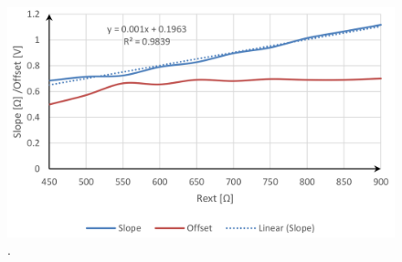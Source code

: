 \begin{figure}
\centering
\includegraphics[width=\textwidth]{Immagini/R3Karagounis}
\caption{ .}%
\label{R3Karagounis}
\end{figure}

